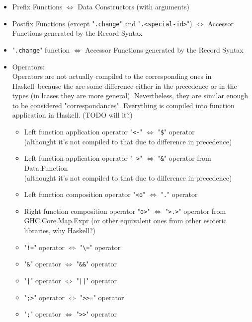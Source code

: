 \documentclass{article}
\def\H{Haskell}
\def\r{$\Longleftrightarrow$ }
\begin{document}
\begin{itemize}
\item
Prefix Functions \r Data Constructors (with arguments)
\item
Postfix Functions (except "\verb|.change|" and "\verb|.<special-id>|")
\r
Accessor Functions generated by the Record Syntax
\item
"\verb|.change|" function
\r
Accessor Functions generated by the Record Syntax
\item
Operators:
\\
Operators are not actually compiled to the corresponding ones in \H\ because
the are some difference either in the precedence or in the types (in lcases
they are more general). Nevertheless, they are similar enough to be considered
"correspondances". Everything is compiled into function application in \H.
(TODO will it?)
\begin{itemize}
\item
Left function application operator "\verb|<-|" \r "\verb|$|" operator
\\
(althought it's not compiled to that due to difference in precedence)

\item
Left function application operator "\verb|->|" \r
"\verb|&|" operator from Data.Function
\\
(althought it's not compiled to that due to difference in precedence)

\item
Left function composition operator "\verb|<o|" \r "\verb|.|" operator

\item
Right function composition operator "\verb|o>|" \r
"\verb|>.>|" operator from GHC.Core.Map.Expr (or other equivalent ones from
other esoteric libraries, why \H?)

\item
"\verb|!=|" operator \r "\verb|\=|" operator

\item
"\verb|&|" operator \r "\verb|&&|" operator

\item
"\texttt{|}" operator \r "\texttt{||}" operator

\item
"\verb|;>|" operator \r "\verb|>>=|" operator

\item
"\verb|;|" operator \r "\verb|>>|" operator

\end{itemize}


\end{itemize}
\end{document}

